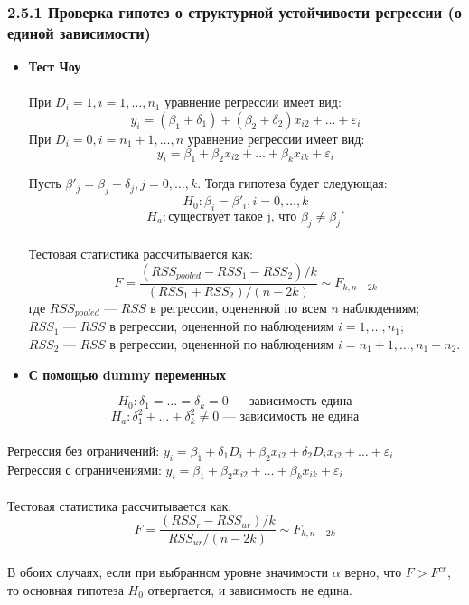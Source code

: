 \documentclass[a0,final]{a0poster}
\begin{document}
\begin{multicols}{4}
\subsubsection*{2.5.1 Проверка гипотез о структурной устойчивости регрессии (о единой зависимости)}
\begin{itemize}
\item \textbf{Тест Чоу} \\
\\
При $D_i = 1, i = 1, \ldots, n_1$ уравнение регрессии имеет вид:
\[y_i=({\beta}_1+\delta_1) +({\beta}_2+\delta_2)x_{i2} + \ldots + {\varepsilon}_i\]
При $D_i = 0, i = n_1+1, \ldots, n$ уравнение регрессии имеет вид:
\[y_i={\beta}_1 +{\beta}_2x_{i2} + \ldots + \beta_kx_{ik} + {\varepsilon}_i \]
\columnbreak

Пусть $\beta'_j = \beta_j+\delta_j, j = 0, \ldots, k$. Тогда гипотеза будет следующая:
\[H_0: \beta_i = \beta'_i, i = 0, \ldots, k\]
\[H_a: \text{существует такое j, что } \beta_j \ne \beta_j'\]
\\
Тестовая статистика рассчитывается как:
\[F = \frac{(RSS_{pooled} - RSS_1-RSS_2)/k}{(RSS_1+RSS_2)/(n-2k)} \sim F_{k, n-2k}\]
где $RSS_{pooled}$ — $RSS$ в регрессии, оцененной по всем $n$ наблюдениям; \\
$RSS_1$ — $RSS$ в регрессии, оцененной по наблюдениям $i=1, \ldots,n_1$; \\
$RSS_2$ — $RSS$ в регрессии, оцененной по наблюдениям $i=n_1+1, \ldots,n_1+n_2$.\\

\item \textbf{С помощью dummy переменных}
\\
\end{itemize}
\[H_0: \delta_1 = \ldots = \delta_k = 0 \text{ — зависимость едина}\]
\[H_a: \delta^2_1 + \ldots + \delta^2_k \ne 0 \text{ — зависимость не едина}\]
\\
Регрессия без ограничений: $y_i={\beta}_1 + \delta_1D_i +{\beta}_2x_{i2} + \delta_2D_ix_{i2} + \ldots + {\varepsilon}_i$ \\
Регрессия с ограничениями: $y_i={\beta}_1 +{\beta}_2x_{i2} + \ldots + \beta_kx_{ik} + {\varepsilon}_i$ \\
\\
Тестовая статистика рассчитывается как:
\[F = \frac{(RSS_r - RSS_{ur})/k}{RSS_{ur}/(n-2k)} \sim F_{k, n-2k}\]
\\
В обоих случаях, если при выбранном уровне значимости $\alpha$ верно, что $F > F^{cr}$, то основная гипотеза $H_0$ отвергается, и зависимость не едина.



\end{multicols}
\end{document}
